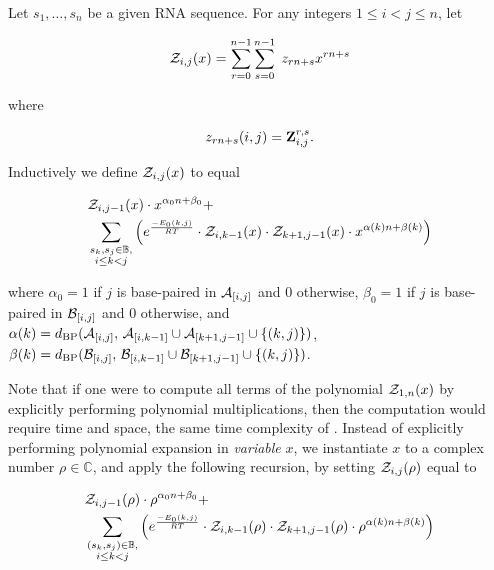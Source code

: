 \begin{theorem}
Let $s_1,\dots,s_n$ be a given RNA sequence.
For any integers $1 \leq i < j \leq n$, let

\begin{align}
{\mathcal Z}_{i,j}(x) = \sum_{r=0}^{n-1} \sum_{s=0}^{n-1}\; z_{rn+s} x^{rn+s}
\end{align}

where

\begin{align}
z_{rn+s}(i,j) = {\bf Z}^{r,s}_{i,j}.
\end{align}

Inductively we define ${\mathcal Z}_{i,j}(x)$ to equal

\begin{align}
\label{eq:ffttwo:polyRecNussJac}
\begin{split}
&\emZof{i,j-1}{x} \cdot x^{\alpha_0n+\beta_0} + \\
&\sum_{\substack{s_k,s_j \in \bpSet,\\i\le k<j}}
\left(\boltzNuss{k,j}\cdot
\emZof{i,k-1}{x} \cdot \emZof{k+1,j-1}{x}\cdot x^{\alpha(k)n+\beta(k)} \right)
\end{split}
\end{align}

where $\alpha_0 = 1$ if $j$ is base-paired in $\mathcal A_{[i,j]}$ and 0 otherwise,
$\beta_0 = 1$ if $j$ is base-paired in $\mathcal B_{[i,j]}$ and 0 otherwise, and
$\alpha(k) =
d_{\text{BP}}(\mathcal A_{[i,j]},\,\mathcal A_{[i,k-1]} \cup \mathcal A_{[k+1,j-1]} \cup \{ (k,j) \})$,
$\beta(k) =
d_{\text{BP}}(\mathcal B_{[i,j]},\,\mathcal B_{[i,k-1]} \cup \mathcal B_{[k+1,j-1]} \cup \{ (k,j) \})$.

\end{theorem}

Note that if one were to compute all terms of the polynomial ${\mathcal Z}_{1,n}(x)$
by explicitly performing polynomial multiplications,
then the computation would require  time and  space, the
same time complexity of \rnatwofold \cite{hofacker:RNAbor2D}.
Instead of explicitly performing polynomial expansion in {\em variable} $x$,
we instantiate $x$ to a
complex number $\rho \in \mathbb{C}$, and apply
the following recursion, by setting ${\mathcal Z}_{i,j}(\rho)$ equal to

\begin{align}
\label{eq:ffttwo:polyRecNussJacInit}
\begin{split}
&\emZof{i,j-1}{\rho} \cdot \rho^{\alpha_0n+\beta_0} + \\
&\sum_{\substack{(s_k,s_j) \in \bpSet,\\i\le k<j}}
\left(\boltzNuss{k,j}\cdot
\emZof{i,k-1}{\rho} \cdot \emZof{k+1,j-1}{\rho}
\cdot \rho^{\alpha(k)n+\beta(k)} \right)
\end{split}
\end{align}


